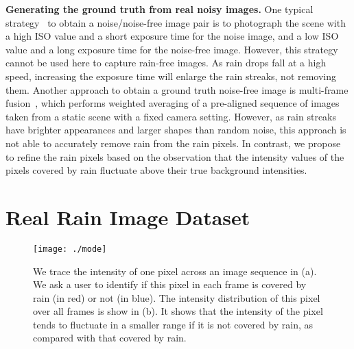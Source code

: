 \documentclass[10pt,twocolumn,letterpaper]{article}
\begin{document}
{\bf Generating the ground truth from real noisy images.} One typical strategy~\cite{anaya:arxiv:2014:RENOIR,plotz:cvpr:2017:noisebench} to obtain a noise/noise-free image pair is to photograph the scene with a high ISO value and a short exposure time for the noise image, and a low ISO value and a long exposure time for the noise-free image. However, this strategy cannot be used here to capture rain-free images. As rain drops fall at a high speed, increasing the exposure time will enlarge the rain streaks, not removing them.
Another approach to obtain a ground truth noise-free image is multi-frame fusion~\cite{zhu:cvpr:2016:denoise,nam:cvpr:2016:hadenoise,abdelhamed:cvpr:2018:dndata},
which performs weighted averaging of a pre-aligned sequence of images taken from a static scene with a fixed camera setting.
However, as rain streaks have brighter appearances and larger shapes than random noise, this approach is not able to accurately remove rain from the rain pixels.
In contrast, we propose to refine the rain pixels based on the observation that the intensity values of the pixels covered by rain fluctuate above their true background intensities.



\section{Real Rain Image Dataset}\label{sec:dataset}



\begin{figure}[h]
\begin{minipage}[t]{\linewidth}
\texttt{[image: ./mode]}
\end{minipage}
\caption{We trace the intensity of one pixel across an image sequence in (a). We ask a user to identify if this pixel in each frame is covered by rain (in red) or not (in blue). The intensity distribution of this pixel over all frames is show in (b). It shows that the intensity of the pixel tends to fluctuate in a smaller range if it is not covered by rain, as compared with that covered by rain.}
\label{fig:mode}
\end{figure}
\end{document}
